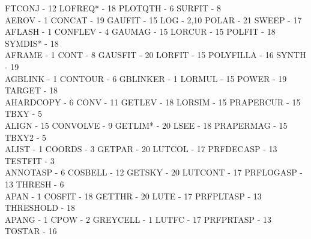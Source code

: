 {\begin{tabbing}
   \>FTCONJ - 12                             \>
 LOFREQ* - 18                            \>PLOTQTH - 6
   \>SURFIT - 8                              \\
 AEROV - 1                               \>CONCAT - 19
   \>GAUFIT - 15                             \>
 LOG - 2,10                              \>POLAR - 21
   \>SWEEP - 17                              \\
 AFLASH - 1                              \>CONFLEV - 4
   \>GAUMAG - 15                             \>
 LORCUR - 15                             \>POLFIT - 18
   \>SYMDIS* - 18                            \\
 AFRAME - 1                              \>CONT - 8
   \>GAUSFIT - 20                            \>
 LORFIT - 15                             \>POLYFILLA - 16
   \>SYNTH - 19                              \\
 AGBLINK - 1                             \>CONTOUR - 6
   \>GBLINKER - 1                            \>
 LORMUL - 15                             \>POWER - 19
   \>TARGET - 18                             \\
 AHARDCOPY - 6                           \>CONV - 11
   \>GETLEV - 18                             \>
 LORSIM - 15                             \>PRAPERCUR - 15
   \>TBXY - 5                                \\
 ALIGN - 15                              \>CONVOLVE - 9
   \>GETLIM* - 20                            \>
 LSEE - 18                               \>PRAPERMAG - 15
   \>TBXY2 - 5                               \\
 ALIST - 1                               \>COORDS - 3
   \>GETPAR - 20                             \>
 LUTCOL - 17                             \>PRFDECASP - 13
   \>TESTFIT - 3                             \\
 ANNOTASP - 6                            \>COSBELL - 12
   \>GETSKY - 20                             \>
 LUTCONT - 17                            \>PRFLOGASP - 13
   \>THRESH - 6                              \\
 APAN - 1                                \>COSFIT - 18
   \>GETTHR - 20                             \>
 LUTE - 17                               \>PRFPLTASP - 13
   \>THRESHOLD - 18                          \\
 APANG - 1                               \>CPOW - 2
   \>GREYCELL - 1                            \>
 LUTFC - 17                              \>PRFPRTASP - 13
   \>TOSTAR - 16                             \\

\end{tabbing}}
